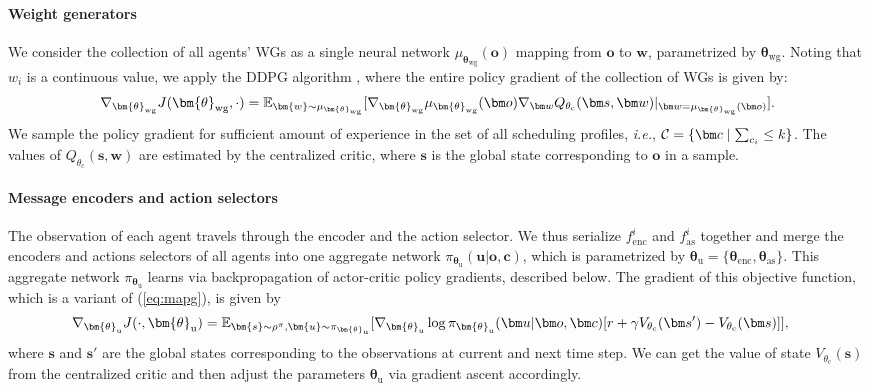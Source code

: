 \documentclass{article} %
\newcommand{\myparagraph}[1]{\vspace{-0.25cm} \paragraph{#1}}
\begin{document}
\myparagraph{Weight generators}
We consider the collection of all agents' WGs as a single neural network $\mu_{\bm{\theta}_\text{wg}}(\bm{o})$ mapping from $\bm{o}$ to $\bm{w}$,
parametrized by $\bm{\theta}_\text{wg}$. 
Noting that $w_i$ is a continuous value, we apply 
the DDPG algorithm \citep{ddpg}, where the entire policy gradient of the collection of WGs is given by:
\begin{align*}
\grad_{\bm{\theta}_{\text{wg}}} J( \bm{\theta}_{\text{wg}} , \cdot ) = \mathbb{E}_{\bm{w} \sim \mu_{\bm{\theta}_\text{wg}}} [
\grad_{\bm{\theta}_{\text{wg}}} \mu_{\bm{\theta}_\text{wg}} ({\bm o}) \grad_{{\bm w}} Q_{{\theta}_{\text{c}}} ({\bm s}, {\bm w})
|_{{\bm w} = \mu_{\bm{\theta}_\text{wg}} ({\bm o})}]. \nonumber
\end{align*}
We sample the policy gradient for sufficient amount of experience in
the set of all scheduling profiles, {\em i.e.}, $\set{C} = \{\vec{c} \mid \sum_{c_i} \leq k \}$.
The values of $Q_{{\theta}_{\text{c}}} ({\bm s}, {\bm w})$ are estimated by the
centralized critic, where ${\bm s}$ is the global state corresponding to
${\bm o}$ in a sample.

\myparagraph{Message encoders and action selectors}
The observation of each agent travels through the encoder and the
action selector. We thus serialize $f^i_{\text{enc}}$ and $f^i_{\text{as}}$ together and
merge the encoders and actions selectors of all agents into one aggregate network
$\pi_{\bm{\theta}_{\text{u}}}({\bm u}|{\bm o},{\bm c})$, which is parametrized by $\bm{\theta}_{\text{u}}=\{\bm{\theta}_{\text{enc}},\bm{\theta}_{\text{as}}\}$. This
aggregate network $\pi_{\bm{\theta}_{\text{u}}}$ learns via backpropagation of actor-critic
policy gradients, described below. The gradient of this objective
function, which is a variant of (\ref{eq:mapg}), is given by
\begin{align}
  \label{eq:a_gradient}
  \grad_{\bm{\theta}_{\text{u}}} J(\cdot,\bm{\theta}_{\text{u}}) 
  &= \mathbb{E}_{\bm{s}\sim \rho^\pi,\bm{u}\sim \pi_{\bm{\theta}_{\text{u}}}}[\grad_{\bm{\theta}_{\text{u}}} \log
                                       \pi_{\bm{\theta}_{\text{u}}}({\bm u}|{\bm o}, {\bm c})[r + \gamma V_{{\theta}_{\text{c}}}({\bm s'}) - V_{{\theta}_{\text{c}}}({\bm s})]],
\end{align}
where ${\bm s}$ and ${\bm s'}$ are the global states corresponding to
the observations at current and next time step. We can get the value
of state $V_{{\theta}_{\text{c}}}({\bm s})$ from the centralized critic and then adjust the
parameters $\bm{\theta}_{\text{u}}$ via gradient ascent accordingly.
\end{document}
